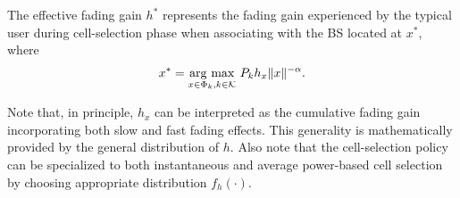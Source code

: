 \documentclass[final]{IEEEtran}
\begin{document}
\begin{definition} \label{def:1}
The effective fading gain $h^*$ represents the fading gain experienced by the typical user during cell-selection phase when associating with the BS located at $x^*$, where 
\begin{align}
x^*=\underset{x \in \Phi_k, k \in \mathcal{K}}{\operatorname{arg~max}}\ P_k h_x\|x\|^{-\alpha}.
\label{eq:cell_selection}
\end{align}
\end{definition}
Note that, in principle, $h_x$ can be interpreted as the cumulative fading gain incorporating both slow and fast fading effects. This generality is mathematically provided by the general distribution of $h$. Also note that the cell-selection policy can be specialized to both instantaneous and average power-based cell selection by choosing appropriate distribution $f_h(\cdot)$. 
\end{document}

